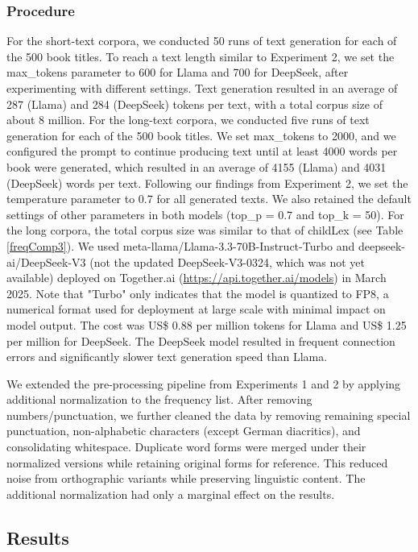 \documentclass[manuscript]{stjour}
\begin{document}
\subsubsection{Procedure}

For the short-text corpora, we conducted 50 runs of text generation for each of the 500 book titles. To reach a text length similar to Experiment 2, we set the max\_tokens parameter to 600 for Llama and 700 for DeepSeek, after experimenting with different settings. Text generation resulted in an average of 287 (Llama) and 284 (DeepSeek) tokens per text, with a total corpus size of about 8 million. For the long-text corpora, we conducted five runs of text generation for each of the 500 book titles. We set max\_tokens to 2000, and we configured the prompt to continue producing text until at least 4000 words per book were generated, which resulted in an average of 4155 (Llama) and 4031 (DeepSeek) words per text. Following our findings from Experiment 2, we set the temperature parameter to 0.7 for all generated texts. We also retained the default settings of other parameters in both models (top\_p = 0.7 and top\_k = 50). For the long corpora, the total corpus size was similar to that of childLex (see Table \ref{freqComp3}). We used meta-llama/Llama-3.3-70B-Instruct-Turbo and deepseek-ai/DeepSeek-V3 (not the updated DeepSeek-V3-0324, which was not yet available) deployed on Together.ai (\url{https://api.together.ai/models}) in March 2025. Note that "Turbo" only indicates that the model is quantized to FP8, a numerical format used for deployment at large scale with minimal impact on model output. The cost was US\$ 0.88 per million tokens for Llama and US\$ 1.25 per million for DeepSeek. The DeepSeek model resulted in frequent connection errors and significantly slower text generation speed than Llama. 

We extended the pre-processing pipeline from Experiments 1 and 2 by applying additional normalization to the frequency list. After removing numbers/punctuation, we further cleaned the data by removing remaining special punctuation, non-alphabetic characters (except German diacritics), and consolidating whitespace. Duplicate word forms were merged under their normalized versions while retaining original forms for reference. This reduced noise from orthographic variants while preserving linguistic content. The additional normalization had only a marginal effect on the results. 

\subsection{Results}
\end{document}
